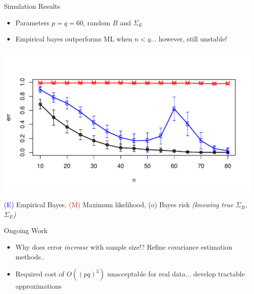 \documentclass[final]{beamer}
\newlength{\onecolwid}
\begin{document}
\begin{frame}[t]
\begin{columns}[t]
\begin{column}{\onecolwid} %


\begin{block}{Simulation Results}
\begin{itemize}
\item Parameters $p = q = 60$, random $B$ and $\Sigma_E$
\item Empirical bayes outperforms ML when $n < q$... however, still unstable!
\end{itemize}
\begin{center}
\includegraphics[scale = 1.3]{simulation1.pdf}
\end{center}
\small{
 \textcolor{blue}{(E)} Empirical Bayes,  \textcolor{red}{(M)} Maximum likelihood,
(o) Bayes risk \emph{(knowing true $\Sigma_B$, $\Sigma_E$)}}
\end{block}

\begin{block}{Ongoing Work}
\begin{itemize}
\item Why does error \emph{increase} with sample size!? Refine covariance estimation methods..
\item Required cost of $O((pq)^3)$ unacceptable for real data... develop tractable approximations
\end{itemize}
\end{block}



\end{column}
\end{columns}
\end{frame}
\end{document}
